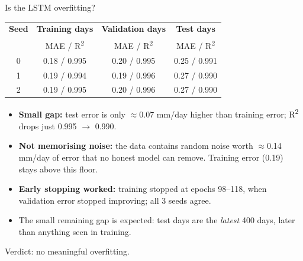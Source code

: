 \documentclass[11pt,aspectratio=169]{beamer}
\begin{document}
\begin{frame}{Is the LSTM overfitting?}
  \begin{table}
    \centering
    \small
    \begin{tabular}{cccc}
      \toprule
      \textbf{Seed} & \textbf{Training days} & \textbf{Validation days} & \textbf{Test days} \\
       & \footnotesize MAE / R\textsuperscript{2} & \footnotesize MAE / R\textsuperscript{2} & \footnotesize MAE / R\textsuperscript{2} \\
      \midrule
      0 & 0.18 / 0.995 & 0.20 / 0.995 & 0.25 / 0.991 \\
      1 & 0.19 / 0.994 & 0.19 / 0.996 & 0.27 / 0.990 \\
      2 & 0.19 / 0.995 & 0.20 / 0.996 & 0.27 / 0.990 \\
      \bottomrule
    \end{tabular}
  \end{table}
  \vspace{-0.6em}
  \footnotesize
  \begin{itemize}
    \item \textbf{Small gap:} test error is only $\approx$0.07 mm/day higher than
      training error; R\textsuperscript{2} drops just 0.995 $\rightarrow$ 0.990.
    \item \textbf{Not memorising noise:} the data contains random noise worth
      $\approx$0.14 mm/day of error that no honest model can remove. Training
      error (0.19) stays above this floor.
    \item \textbf{Early stopping worked:} training stopped at epochs 98--118,
      when validation error stopped improving; all 3 seeds agree.
    \item The small remaining gap is expected: test days are the
      \emph{latest} 400 days, later than anything seen in training.
  \end{itemize}
  \alert{Verdict: no meaningful overfitting.}
\end{frame}
\end{document}
